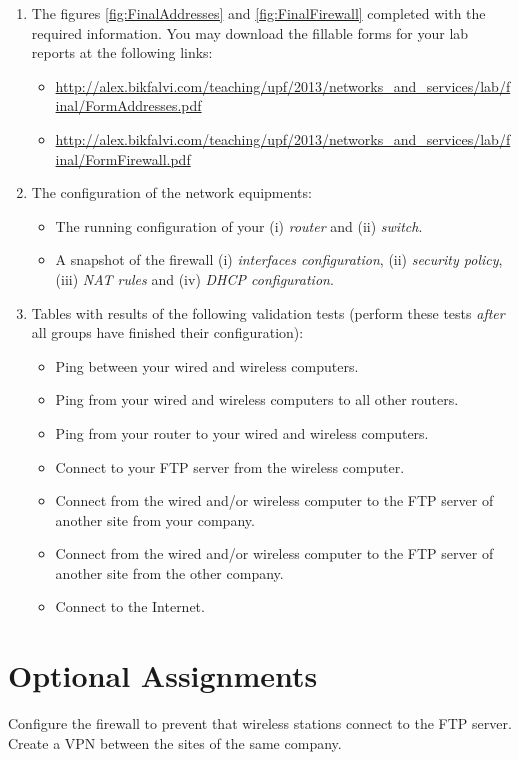 \begin{enumerate}
\item The figures \ref{fig:FinalAddresses} and \ref{fig:FinalFirewall} completed with the required information. You may download the fillable forms for your lab reports at the following links:
\begin{itemize}
\item \url{http://alex.bikfalvi.com/teaching/upf/2013/networks_and_services/lab/final/FormAddresses.pdf}
\item \url{http://alex.bikfalvi.com/teaching/upf/2013/networks_and_services/lab/final/FormFirewall.pdf}
\end{itemize}

\item The configuration of the network equipments:
\begin{itemize}
\item The running configuration of your (i) \emph{router} and (ii) \emph{switch}.
\item A snapshot of the firewall (i) \emph{interfaces configuration}, (ii) \emph{security policy}, (iii) \emph{NAT rules} and (iv) \emph{DHCP configuration}.
\end{itemize}
\item Tables with results of the following validation tests (perform these tests \emph{after} all groups have finished their configuration):
\begin{itemize}
\item Ping between your wired and wireless computers.
\item Ping from your wired and wireless computers to all other routers.
\item Ping from your router to your wired and wireless computers.
\item Connect to your FTP server from the wireless computer.
\item Connect from the wired and/or wireless computer to the FTP server of another site from your company.
\item Connect from the wired and/or wireless computer to the FTP server of another site from the other company.
\item Connect to the Internet.
\end{itemize}
\end{enumerate}



\section{Optional Assignments}

Configure the firewall to prevent that wireless stations connect to the FTP server. Create a VPN between the sites of the same company.


